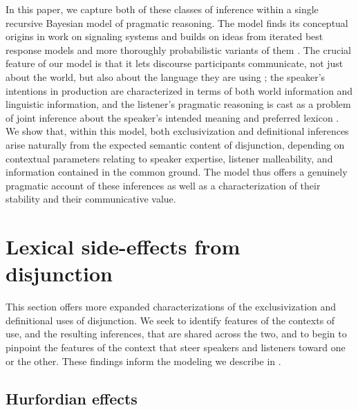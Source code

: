 \documentclass{article}
\begin{document}
In this paper, we capture both of these classes of inference within a
single recursive Bayesian model of pragmatic reasoning. The model
finds its conceptual origins in  work on signaling
systems and builds on ideas from iterated best response models
\citet{Jaeger:2007,Jaeger:2011,Franke09DISS} and more thoroughly
probabilistic variants of them
\citep{CamererHo:2004,Frank:Goodman:2012}. The crucial feature of our
model is that it lets discourse participants communicate, not just
about the world, but also about the language they are using
\citep{Bergen:Goodman:Levy:2012,bergen-levy-goodman:2014}; the
speaker's intentions in production are characterized in terms of both
world information and linguistic information, and the listener's
pragmatic reasoning is cast as a problem of joint inference about the
speaker's intended meaning and preferred lexicon
\citep{Smith:Goodman:Frank:2013}. We show that, within this model,
both exclusivization and definitional inferences arise naturally from
the expected semantic content of disjunction, depending on contextual
parameters relating to speaker expertise, listener malleability, and
information contained in the common ground. The model thus offers a
genuinely pragmatic account of these inferences as well as a
characterization of their stability and their communicative value.


\section{Lexical side-effects from disjunction}\label{sec:data}

This section offers more expanded characterizations of the
exclusivization and definitional uses of disjunction. We seek to
identify features of the contexts of use, and the resulting
inferences, that are shared across the two, and to begin to pinpoint
the features of the context that steer speakers and listeners toward
one or the other. These findings inform the modeling we describe in
.



\subsection{Hurfordian effects}\label{sec:data:overlapping}
\end{document}
